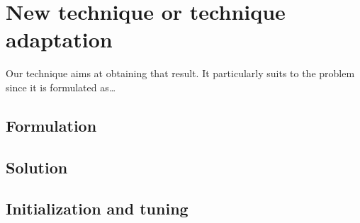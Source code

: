 \section{New technique or technique adaptation}
\label{sec:technique}
%
Our technique aims at obtaining that result. It particularly suits to the problem since it is formulated as\ldots{}


\subsection{Formulation}


\subsection{Solution}


\subsection{Initialization and tuning}